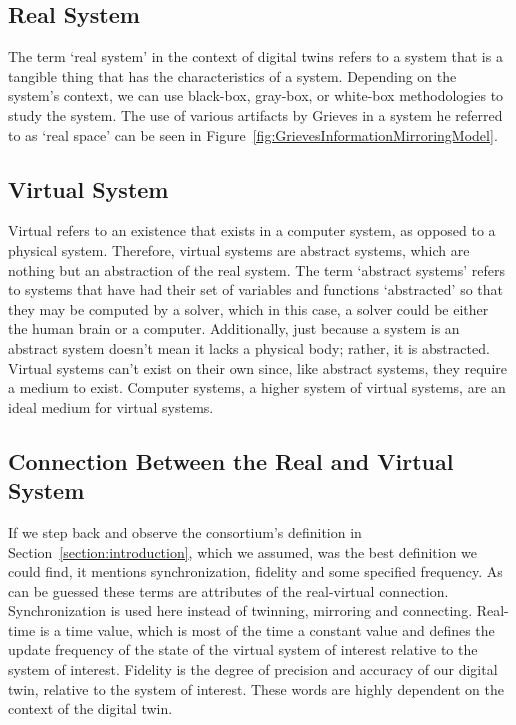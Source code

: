 \documentclass{llncs}
\begin{document}
    \subsection*{Real System}

    The term `real system' in the context of digital twins refers to a system that is a tangible thing that has the characteristics of a system. Depending on the system's context, we can use black-box, gray-box, or white-box methodologies to study the system. 
    The use of various artifacts by Grieves in a system he referred to as `real space' can be seen in Figure~\ref{fig:GrievesInformationMirroringModel}.

    \subsection*{Virtual System}
    Virtual refers to an existence that exists in a computer system, as opposed to a physical system. Therefore, virtual systems are abstract systems, which are nothing but an abstraction of the real system.
    The term `abstract systems' refers to systems that have had their set of variables and functions `abstracted' so that they may be computed by a solver, which in this case, a solver could be either the human brain or a computer.
    Additionally, just because a system is an abstract system doesn't mean it lacks a physical body; rather, it is abstracted. 
    Virtual systems can't exist on their own since, like abstract systems, they require a medium to exist. Computer systems, a higher system of virtual systems, are an ideal medium for virtual systems.
    
    \subsection*{Connection Between the Real and Virtual System}
    If we step back and observe the consortium's definition in Section~\ref{section:introduction}, which we assumed, was the best definition we could find, 
    it mentions synchronization, fidelity and some specified frequency. As can be guessed these terms are attributes of the real-virtual connection.
    Synchronization is used here instead of twinning, mirroring and connecting. 
    Real-time is a time value, which is most of the time a constant value and defines the update frequency of the state of the virtual system of interest relative to the system of interest.
    Fidelity is the degree of precision and accuracy of our digital twin, relative to the system of interest.
    These words are highly dependent on the context of the digital twin.
\end{document}
